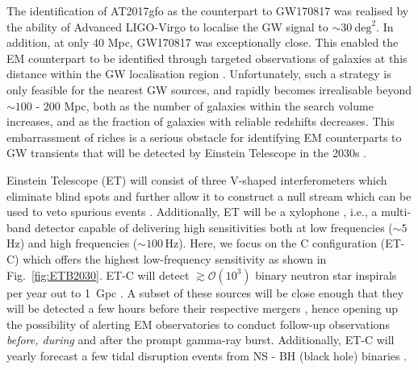 \documentclass{aa}
\begin{document}
The identification of AT2017gfo as the counterpart to GW170817 was realised by the 
ability of Advanced LIGO-Virgo to localise the GW signal to $\sim30~\mathrm{deg}^2$.
In addition, at only 40 Mpc, GW170817 was exceptionally close. This enabled the EM counterpart to be identified through targeted observations of galaxies at this distance within the GW localisation region \citep{Coul17}. Unfortunately, such a strategy is only feasible for the nearest GW sources, and rapidly becomes irrealisable beyond $\sim100$ - $200$ Mpc, both as the number of galaxies within the search volume increases, and as the fraction of galaxies with reliable redshifts decreases. 
This embarrassment of riches is a serious obstacle for identifying EM counterparts to GW transients that will be detected by Einstein Telescope in the 2030s \citep{ET_doc}.

 Einstein Telescope (ET) will consist of three
 V-shaped interferometers which eliminate blind spots and further allow it to construct a null
 stream \citep{Sathyaprakash:2012jk} which can be used to veto spurious events \citep{Wen:2005ui}. 
 Additionally, ET will be a xylophone \citep{Hild:2009ns}, i.e., a multi-band detector capable of delivering high sensitivities both at low frequencies ($\sim 5\,$Hz) and high frequencies ($\sim 100\,$Hz). 
 Here, we focus on the C configuration (ET-C) which offers the highest low-frequency sensitivity as shown in Fig.~\ref{fig:ETB2030}.
 ET-C will detect $\gtrsim\mathcal{O}(10^3)$ binary neutron star inspirals per year out to 1~Gpc \citep{Akcay18}.  %
 A subset of these sources will be close enough that they will be detected a few hours
before their respective mergers \citep{Akcay18}, hence opening up the possibility of alerting EM
observatories to conduct follow-up observations \emph{before, during} and after the prompt gamma-ray burst. 
Additionally, ET-C will yearly forecast a few tidal disruption events from NS - BH (black hole) binaries \citep{Akcay18}.
\end{document}
